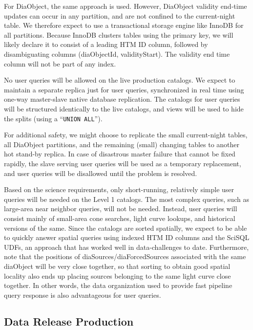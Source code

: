 \documentclass[DM,lsstdraft,toc]{lsstdoc}
\begin{document}
For DiaObject, the same approach is used. However, DiaObject validity
end-time updates can occur in any partition, and are not confined to the
current-night table. We therefore expect to use a transactional storage
engine like InnoDB for all partitions. Because InnoDB clusters tables
using the primary key, we will likely declare it to consist of a leading
HTM ID column, followed by disambiguating columns (diaObjectId,
validityStart). The validity end time column will not be part of any
index.

No user queries will be allowed on the live production catalogs. We
expect to maintain a separate replica just for user queries,
synchronized in real time using one-way master-slave native database
replication. The catalogs for user queries will be structured
identically to the live catalogs, and views will be used to hide the
splits (using a ``\texttt{UNION\ ALL}'').

For additional safety, we might choose to replicate the small
current-night tables, all DiaObject partitions, and the remaining
(small) changing tables to another hot stand-by replica. In case of
disastrous master failure that cannot be fixed rapidly, the slave
serving user queries will be used as a temporary replacement, and user
queries will be disallowed until the problem is resolved.

Based on the science requirements, only short-running, relatively simple
user queries will be needed on the Level 1 catalogs. The most complex
queries, such as large-area near neighbor queries, will not be needed.
Instead, user queries will consist mainly of small-area cone searches,
light curve lookups, and historical versions of the same. Since the
catalogs are sorted spatially, we expect to be able to quickly answer
spatial queries using indexed HTM ID columns and the SciSQL UDFs, an
approach that has worked well in data-challenges to date. Furthermore,
note that the positions of diaSources/diaForcedSources associated with
the same diaObject will be very close together, so that sorting to
obtain good spatial locality also ends up placing sources belonging to
the same light curve close together. In other words, the data
organization used to provide fast pipeline query response is also
advantageous for user queries.

\subsection{Data Release Production}\label{data-release-production}
\end{document}
